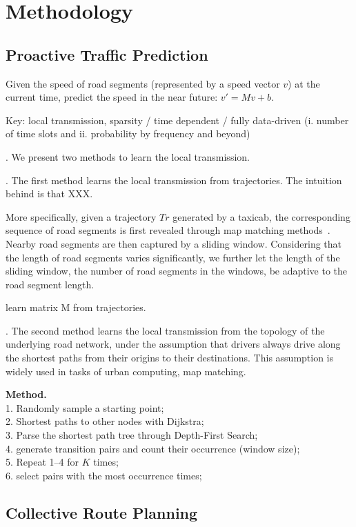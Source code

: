 \section{Methodology}
\label{sec-method}


\subsection{Proactive Traffic Prediction}
\label{subsec-proactive}

Given the speed of road segments (represented by a speed vector $v$) at the current time, predict the speed in the near future: $v'=Mv+b$.

Key: local transmission, \ie sparsity / time dependent / fully data-driven (i. number of time slots and ii. probability by frequency and beyond)


. We present two methods to learn the local transmission.

.
The first method learns the local transmission from trajectories. The intuition behind is that XXX.

More specifically, given a trajectory $Tr$ generated by a taxicab, the corresponding sequence of road segments is first revealed through map matching methods~\cite{Newson2009MM}. Nearby road segments are then captured by a sliding window. Considering that the length of road segments varies significantly, we further let the length of the sliding window, \ie the number of road segments in the windows, be adaptive to the road segment length. 

\begin{example}
learn matrix M from trajectories. 
\end{example}

. 
The second method learns the local transmission from the topology of the underlying road network, under the assumption that drivers always drive along the shortest paths from their origins to their destinations. This assumption is widely used in tasks of urban computing, \eg map matching. 

{\bf Method.} \\
1. Randomly sample a starting point; \\
2. Shortest paths to other nodes with Dijkstra; \\
3. Parse the shortest path tree through Depth-First Search; \\
4. generate transition pairs and count their occurrence (window size); \\
5. Repeat 1--4 for $K$ times; \\
6. select pairs with the most occurrence times;






\subsection{Collective Route Planning}
\label{subsec-route}

